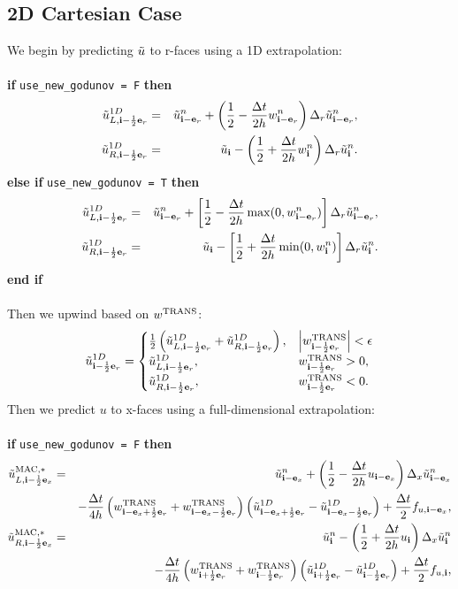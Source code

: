 \subsection{2D Cartesian Case}
We begin by predicting $\tilde{u}$ to r-faces using a 1D extrapolation:\\ \\
{\bf if} {\tt use\_new\_godunov = F} {\bf then}
\begin{eqnarray}
\tilde{u}_{L,{\bf i}-\frac{1}{2}{\bf e}_r}^{1D} &=& \tilde{u}_{{\bf i}-{\bf e}_r}^n + \left(\frac{1}{2} - \frac{\Delta t}{2h}w_{{\bf i}-{\bf e}_r}^n\right)\Delta_r \tilde{u}_{{\bf i}-{\bf e}_r}^n, \\
\tilde{u}_{R,{\bf i}-\frac{1}{2}{\bf e}_r}^{1D} &=& \tilde{u}_{{\bf i}} - \left(\frac{1}{2} + \frac{\Delta t}{2h}w_{{\bf i}}^n\right)\Delta_r \tilde{u}_{{\bf i}}^n.
\end{eqnarray}
{\bf else if} {\tt use\_new\_godunov = T} {\bf then}
\begin{eqnarray}
\tilde{u}_{L,{\bf i}-\frac{1}{2}{\bf e}_r}^{1D} &=& \tilde{u}_{{\bf i}-{\bf e}_r}^n + \left[\frac{1}{2} - \frac{\Delta t}{2h}\max(0,w_{{\bf i}-{\bf e}_r}^n)\right]\Delta_r \tilde{u}_{{\bf i}-{\bf e}_r}^n, \\
\tilde{u}_{R,{\bf i}-\frac{1}{2}{\bf e}_r}^{1D} &=& \tilde{u}_{{\bf i}} - \left[\frac{1}{2} + \frac{\Delta t}{2h}\min(0,w_{{\bf i}}^n)\right]\Delta_r \tilde{u}_{{\bf i}}^n.
\end{eqnarray}
{\bf end if}\\ \\
Then we upwind based on $w^{\rm TRANS}$:
\begin{equation}
\tilde{u}_{{\bf i}-\frac{1}{2}{\bf e}_r}^{1D} =
\begin{cases}
\frac{1}{2}\left(\tilde{u}_{L,{\bf i}-\frac{1}{2}{\bf e}_r}^{1D} + \tilde{u}_{R,{\bf i}-\frac{1}{2}{\bf e}_r}^{1D}\right), & \left|w^{\rm TRANS}_{{\bf i}-\frac{1}{2}{\bf e}_r}\right| < \epsilon \\
\tilde{u}_{L,{\bf i}-\frac{1}{2}{\bf e}_r}^{1D}, & w^{\rm TRANS}_{{\bf i}-\frac{1}{2}{\bf e}_r} > 0, \\
\tilde{u}_{R,{\bf i}-\frac{1}{2}{\bf e}_r}^{1D}, & w^{\rm TRANS}_{{\bf i}-\frac{1}{2}{\bf e}_r} < 0. \\
\end{cases}
\end{equation}
Then we predict $u$ to x-faces using a full-dimensional extrapolation:\\ \\
{\bf if} {\tt use\_new\_godunov = F} {\bf then}
\begin{eqnarray}
\tilde{u}_{L,{\bf i}-\frac{1}{2}{\bf e}_x}^{\rm MAC,*} &=& \tilde{u}_{{\bf i}-{\bf e}_x}^n + \left(\frac{1}{2} - \frac{\Delta t}{2h}u_{{\bf i}-{\bf e}_x}\right)\Delta_x \tilde{u}_{{\bf i}-{\bf e}_x}^n \nonumber \\
&& -\frac{\Delta t}{4h}\left(w_{{\bf i}-{\bf e}_x+\frac{1}{2}{\bf e}_r}^{\rm TRANS}+w_{{\bf i}-{\bf e}_x-\frac{1}{2}{\bf e}_r}^{\rm TRANS}\right)\left(\tilde{u}_{{\bf i}-{\bf e}_x+\frac{1}{2}{\bf e}_r}^{1D} - \tilde{u}_{{\bf i}-{\bf e}_x-\frac{1}{2}{\bf e}_r}^{1D}\right) + \frac{\Delta t}{2}f_{u,{\bf i}-{\bf e}_x}, \\
\tilde{u}_{R,{\bf i}-\frac{1}{2}{\bf e}_x}^{\rm MAC,*} &=& \tilde{u}_{{\bf i}}^n - \left(\frac{1}{2} + \frac{\Delta t}{2h}u_{{\bf i}}\right)\Delta_x \tilde{u}_{{\bf i}}^n \nonumber \\
&& -\frac{\Delta t}{4h}\left(w_{{\bf i}+\frac{1}{2}{\bf e}_r}^{\rm TRANS}+w_{{\bf i}-\frac{1}{2}{\bf e}_r}^{\rm TRANS}\right)\left(\tilde{u}_{{\bf i}+\frac{1}{2}{\bf e}_r}^{1D} - \tilde{u}_{{\bf i}-\frac{1}{2}{\bf e}_r}^{1D}\right) + \frac{\Delta t}{2}f_{u,{\bf i}},
\end{eqnarray}
